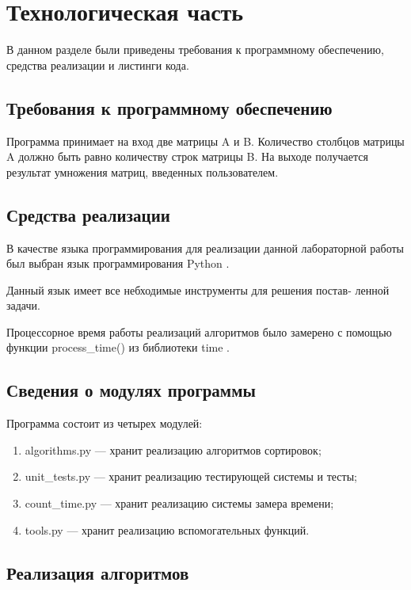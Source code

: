 \chapter{Технологическая часть}

В данном разделе были приведены требования к программному обеспечению, средства реализации и листинги кода.

\section{Требования к программному обеспечению}

Программа принимает на вход две матрицы A и B. Количество столбцов матрицы A должно быть равно количеству строк матрицы B. На выходе получается результат умножения матриц, введенных пользователем.


\section{Средства реализации}

В качестве языка программирования для реализации данной лабораторной работы был выбран язык программирования Python \cite{pythonlang}. 

Данный язык имеет все небходимые инструменты для решения постав-
ленной задачи.

Процессорное время работы реализаций алгоритмов было замерено с помощью функции process\_time() из библиотеки time \cite{pythonlangtime}.

\section{Сведения о модулях программы}
Программа состоит из четырех модулей:
\begin{enumerate}[label={\arabic*)}]
	\item algorithms.py --- хранит реализацию алгоритмов сортировок;
	\item unit\_tests.py --- хранит реализацию тестирующей системы и тесты;
	\item count\_time.py --- хранит реализацию системы замера времени;
	\item tools.py --- хранит реализацию вспомогательных функций.
\end{enumerate}


\section{Реализация алгоритмов}

